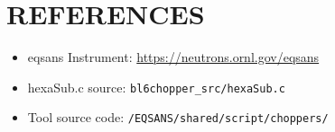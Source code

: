 \documentclass[tm]{ornltm}
\begin{document}
\section{REFERENCES}

\begin{itemize}
    \item \ac{eqsans} Instrument: \href{https://neutrons.ornl.gov/eqsans}{https://neutrons.ornl.gov/eqsans}
    \item hexaSub.c source: \texttt{bl6chopper\_src/hexaSub.c}
    \item Tool source code: \texttt{/EQSANS/shared/script/choppers/}
\end{itemize}

\backmatter

\end{document}
